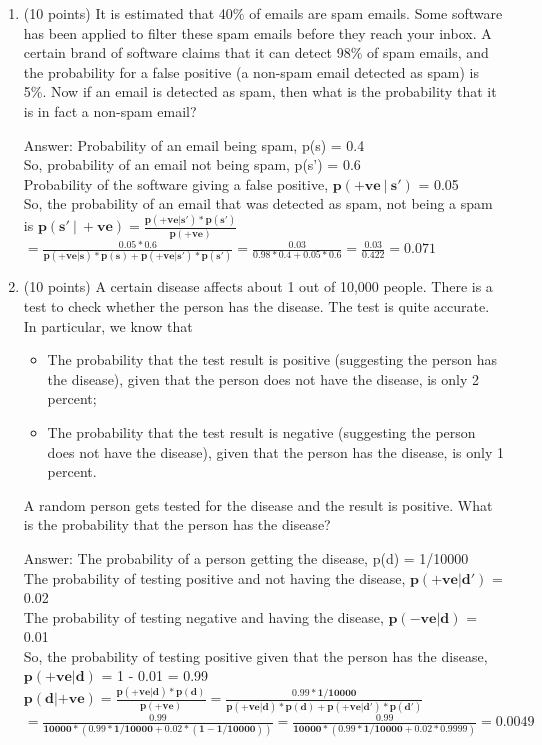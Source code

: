 \documentclass{article}%
\begin{document}
\begin{enumerate}
    \item (10 points) It is estimated that 40\% of emails are spam emails. Some software has been applied to filter these spam emails before they reach your inbox. A certain brand of software claims that it can detect 98\% of spam emails, and the probability for a false positive (a non-spam email detected as spam) is 5\%. Now if an email is detected as spam, then what is the probability that it is in fact a non-spam email?
    
    Answer: Probability of an email being spam, p(s) = 0.4 \\ 
    So, probability of an email not being spam, p(s') = 0.6 \\
    Probability of the software giving a false positive, $\mathbf{ p(+ve \ | \ s') }$ = 0.05 \\
    So, the probability of an email that was detected as spam, not being a spam is $\mathbf{ p(s' \ | \ +ve) = \frac{p(+ve | s') * p(s')}{p(+ve)} }$ \\
    $\mathbf{ = \frac{0.05 * 0.6}{p(+ve|s) * p(s) + p(+ve|s') * p(s')} = \frac{0.03}{0.98 * 0.4 + 0.05 * 0.6} = \frac{0.03}{0.422} = 0.071 }$

    \item (10 points) A  certain  disease  affects  about 1 out  of 10,000  people.  There  is  a  test  to  check whether the person has the disease. The test is quite accurate. In particular, we know that

    \begin{itemize}
        \item The probability that the test result is positive  (suggesting the person has the disease), given that the person does not have the disease, is only 2 percent; 
        \item The probability that the test result is negative (suggesting the person does not have the disease), given that the person has the disease, is only 1 percent. 
    \end{itemize}

    A random person gets tested for the disease and the result is positive. What is the probability that the person has the disease?

    Answer: The probability of a person getting the disease, p(d) = 1/10000 \\
    The probability of testing positive and not having the disease, $\mathbf{ p(+ve|d') }$ = 0.02 \\
    The probability of testing negative and having the disease, $\mathbf{ p(-ve|d) }$ = 0.01 \\
    So, the probability of testing positive given that the person has the disease, $\mathbf{ p(+ve|d) }$ = 1 - 0.01 = 0.99 \\
    $\mathbf{ p(d|+ve) = \frac{p(+ve|d) * p(d)}{p(+ve)} = \frac{0.99 * 1/10000}{p(+ve|d)*p(d) + p(+ve|d')*p(d')}}$ \\
    $\mathbf{ = \frac{0.99}{10000 * (0.99 * 1/10000 + 0.02 * (1 - 1/10000))} = \frac{0.99}{10000 * (0.99 * 1/10000 + 0.02 * 0.9999)} = 0.0049 }$
\end{enumerate}
\end{document}

